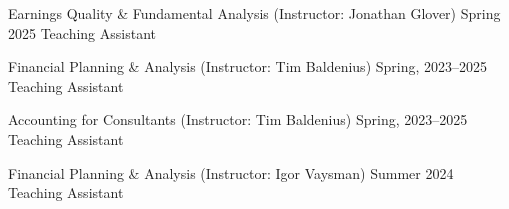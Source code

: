

\begin{cventries}

\cventrysimple
    {Earnings Quality \& Fundamental Analysis (Instructor: Jonathan Glover)}  %
    {Spring 2025} %
    {Teaching Assistant}
	
\cventrysimple
    {Financial Planning \& Analysis (Instructor: Tim Baldenius)}  %
    {Spring, 2023--2025} %
    {Teaching Assistant}
	
\cventrysimple
	{Accounting for Consultants (Instructor: Tim Baldenius)}  %
    {Spring, 2023--2025} %
    {Teaching Assistant}
    
\cventrysimple
    {Financial Planning \& Analysis (Instructor: Igor Vaysman)}  %
    {Summer 2024} %
    {Teaching Assistant}

\end{cventries}
